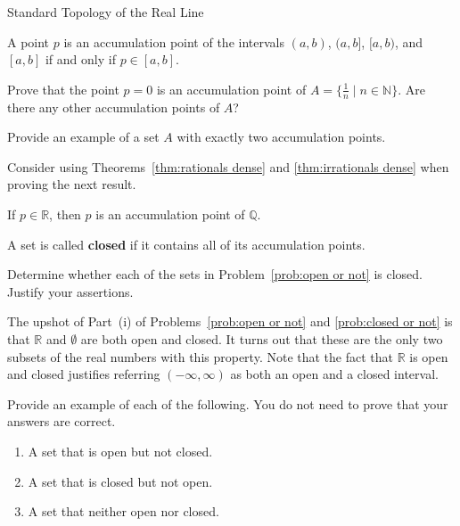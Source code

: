 \begin{section}{Standard Topology of the Real Line}
\begin{theorem}
A point $p$ is an accumulation point of the intervals $(a,b)$, $(a,b]$, $[a,b)$, and $[a,b]$ if and only if $p\in [a,b]$.
\end{theorem}

\begin{problem}
Prove that the point $p=0$ is an accumulation point of $A=\{\frac{1}{n}\mid n \in \mathbb{N}\}$.  Are there any other accumulation points of $A$? 
\end{problem}

\begin{problem}
Provide an example of a set $A$ with exactly two accumulation points.
\end{problem}

Consider using Theorems~\ref{thm:rationals dense} and \ref{thm:irrationals dense} when proving the next result.

\begin{theorem}
If $p\in\mathbb{R}$, then $p$ is an accumulation point of $\mathbb{Q}$.
\end{theorem}

\begin{definition}
A set is called \textbf{closed} if it contains all of its accumulation points.
\end{definition}

\begin{problem}\label{prob:closed or not}
Determine whether each of the sets in Problem~\ref{prob:open or not} is closed. Justify your assertions.
\end{problem}

The upshot of Part~(i) of Problems~\ref{prob:open or not} and \ref{prob:closed or not} is that $\mathbb{R}$ and $\emptyset$ are both open and closed.  It turns out that these are the only two subsets of the real numbers with this property.  Note that the fact that $\mathbb{R}$ is open and closed justifies referring $(-\infty, \infty)$ as both an open and a closed interval.

\begin{problem}\label{prob:open vs closed}
Provide an example of each of the following.  You do not need to prove that your answers are correct.
\begin{enumerate}[label=\textrm{(\alph*)}]
\item A set that is open but not closed.
\item A set that is closed but not open.
\item\label{prob:open vs closed last} A set that neither open nor closed.
\end{enumerate}
\end{problem}


\end{section}
